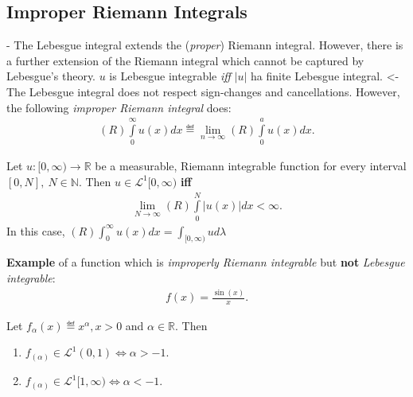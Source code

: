 \subsection*{Improper Riemann Integrals}
- The Lebesgue integral extends the (\emph{proper}) Riemann integral. However, there is a further extension of the Riemann integral which
cannot be captured by Lebesgue's theory. \(u\) is Lebesgue integrable \emph{iff} \(\vert u\vert\) ha finite Lebesgue integral. <- The Lebesgue
integral does not respect sign-changes and cancellations. However, the following \emph{improper Riemann integral} does:
\begin{eqnarray}
    (R)\int\limits_{0}^{\infty}u(x)dx\eqdef \lim\limits_{n\rightarrow\infty}(R)\int\limits_{0}^{a}u(x)dx.
\end{eqnarray}
\begin{corollary}
    Let \(u:[0,\infty) \rightarrow\mathbb{R}\) be a measurable, Riemann integrable function for every interval \([0,N], \ N\in\mathbb{N}\). 
    Then \(u\in\mathcal{L}^{1}[0,\infty)\)
    \textbf{iff}
    \begin{align}
        \lim\limits_{N\rightarrow\infty}(R)\int\limits_{0}^{N}\vert u(x)\vert dx < \infty.
    \end{align}
    In this case, \((R)\int_{0}^{\infty}u(x)dx = \int_{[0,\infty)}ud\lambda\)
\end{corollary}
\ifdetailed
\textbf{Example} of a function which is \emph{improperly Riemann integrable} but \textbf{not} \emph{Lebesgue integrable}:
\begin{align}
    f(x) = \frac{\sin(x)}{x}.
\end{align}
\fi 
\begin{proposition}
    Let \(f_{\alpha}(x)\eqdef x^{\alpha}, x>0\) and \(\alpha\in\mathbb{R}\). Then 
    \begin{enumerate}[label=(\roman*)]
        \item \(f_(\alpha)\in\mathcal{L}^{1}(0,1)\Leftrightarrow \alpha > -1\).
        \item \(f_(\alpha)\in\mathcal{L}^{1}[1,\infty)\Leftrightarrow \alpha < -1\).
    \end{enumerate}
\end{proposition}